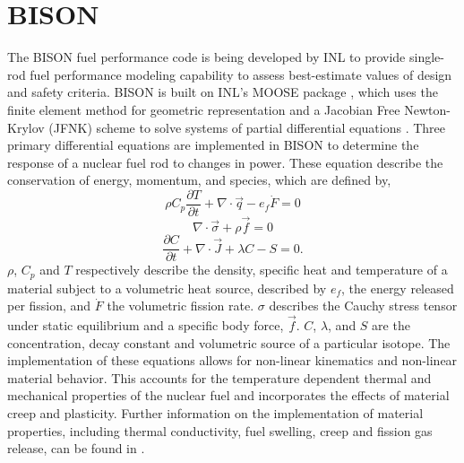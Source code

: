 \documentclass[edeposit,fullpage,11pt]{uiucthesis2009}
\begin{document}
\section{BISON}

The BISON fuel performance code is being developed by \gls{INL} to provide single-rod fuel performance modeling capability to assess best-estimate values of design and safety criteria. 
BISON is built on \gls{INL}'s \gls{MOOSE} package \cite{gaston_moose:_2009}, which uses the finite element method for geometric representation and a Jacobian Free Newton-Krylov (JFNK) scheme to solve systems of partial differential equations \cite{williamson_multidimensional_2012}. 
Three primary differential equations are implemented in BISON to determine the response of a nuclear fuel rod to changes in  power.
These equation describe the conservation of energy, momentum, and species, which are defined by,
\begin{equation} \label{eqn:bis_eng}
\rho C_p \frac{\partial T}{\partial t} + \nabla \cdot \vec{q} - e_f \dot{F} =0
\end{equation} 
\begin{equation} \label{eqn:bis_mom}
\nabla \cdot \vec{\sigma} + \rho \vec{f} =0
\end{equation} 
\begin{equation} \label{eqn:bis_spec}
\frac{\partial C}{\partial t} + \nabla \cdot \vec{J} +\lambda C - S =0.
\end{equation} 
$\rho$, $C_p$ and $T$ respectively describe the density, specific heat and temperature of a material subject to a volumetric heat source, described by $e_f$, the energy released per fission, and $\dot{F}$ the volumetric fission rate.
$\sigma$ describes the Cauchy stress tensor under static equilibrium and a specific body force, $\vec{f}$.
$C$, $\lambda$, and $S$ are the concentration, decay constant and volumetric source of a particular isotope.
The implementation of these equations allows for non-linear kinematics and non-linear material behavior.
This accounts for the temperature dependent thermal and mechanical properties of the nuclear fuel and incorporates the effects of material creep and plasticity.
Further information on the implementation of material properties, including thermal conductivity, fuel swelling, creep and fission gas release, can be found in \cite{williamson_bison_year,williamson_manual}.
\end{document}
